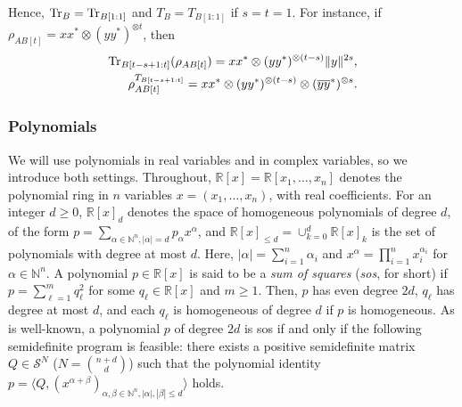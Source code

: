 \documentclass[11pt]{article}
\newcommand{\N}{\ensuremath{\mathbb{N}}}   %
\newcommand{\R}{\ensuremath{\mathbb{R}}}   %
\newcommand{\C}{\ensuremath{\mathbb{C}}} %
\newcommand{\MS}{{\mathcal S}}
\newcommand{\Herm}{\mathrm{Herm}}
\newcommand{\Cnnt}{\C^n\ot (\C^n)^{\ot t}}
\newcommand{\Tr}{\text{\rm Tr}}
\newcommand{\ot}{\otimes}
\newcommand{\ui}{\underline{i}}
\newcommand{\uj}{\underline{j}}
\newcommand{\uk}{\underline{k}}
\newcommand{\uh}{\underline{h}}
\newcommand{\ovy}{\overline y}
\theoremstyle{plain}
\newcommand{\ML}{\textcolor{blue}}
\begin{document}
Hence, $\Tr_B=\Tr_{B[1:1]}$ and $T_B=T_{B[1:1]}$ if $s=t=1$. For instance, if $\rho_{AB[t]}=xx^*\ot (yy^*)^{\ot t}$, then
\begin{align}\label{eq:basicPT}
\begin{split}
\Tr_{B[t-s+1:t]}(\rho_{AB[t]})= xx^*\ot (yy^*)^{\ot (t-s)} \|y\|^{2s}, \\
\rho_{AB[t]}^{T_{B[t-s+1:t]}} = xx^*\ot (y y^*)^{\ot (t-s)}\ot (\ovy \ovy^*)^{\ot s}.
\end{split}\end{align}



\subsubsection*{Polynomials}

We will use polynomials in real variables and in complex variables, so we introduce both settings. Throughout, $\R[x]=\R[x_1,\ldots,x_n]$ denotes the polynomial ring in $n$ variables $x=(x_1,\ldots,x_n)$, with real coefficients. For an integer $d\ge 0$, $\R[x]_{d}$ denotes the space of homogeneous polynomials  of degree $d$, of the form $p=\sum_{\alpha\in\N^n, |\alpha|=d}p_\alpha x^\alpha$, and $\R[x]_{\le d}=\cup_{k=0}^d\R[x]_k$ is the set of polynomials with degree at most $d$. Here, $|\alpha|=\sum_{i=1}^n\alpha_i$ and $x^\alpha=\prod_{i=1}^n x_i^{\alpha_i}$ for $\alpha\in\N^n$.
A polynomial $p\in \R[x]$ is said to be a {\em sum of squares} ({\em sos}, for short) if $p=\sum_{\ell=1}^m q_\ell^2$ for some $q_\ell \in\R[x] $ and $m\ge 1$. Then, $p$ has even degree $2d$, $q_\ell$ has degree at most $d$, and each $q_\ell$ is homogeneous of degree $d$ if $p$ is homogeneous. 
As is well-known,   %
a polynomial $p$ of degree $2d$ is sos if and only if  the following   semidefinite program is feasible: there exists   a positive semidefinite matrix $Q\in \MS^N$ ($N={n+d\choose d}$) such that the polynomial identity $p=\langle Q, (x^{\alpha+\beta})_{\alpha,\beta\in\N^n, |\alpha|,|\beta|\le d}\rangle$ holds. 
\end{document}
